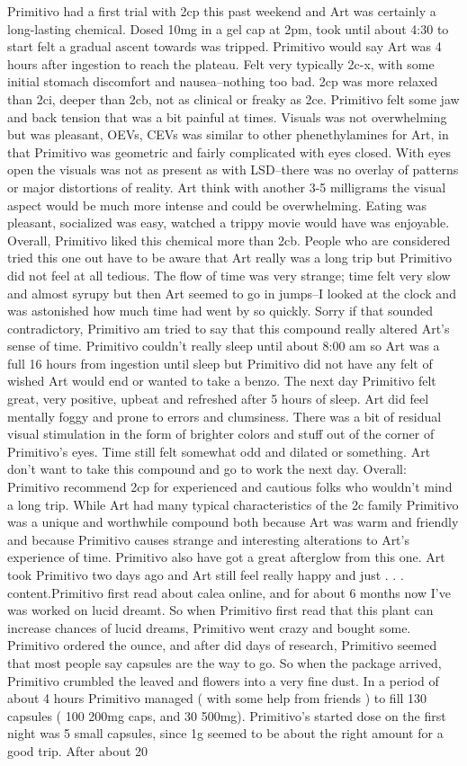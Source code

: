 \documentclass[12pt]{book}
\begin{document}
Primitivo had a first trial with 2cp this past weekend and Art was certainly a long-lasting chemical. Dosed 10mg in a gel cap at 2pm, took until about 4:30 to start felt a gradual ascent towards was tripped. Primitivo would say Art was 4 hours after ingestion to reach the plateau. Felt very typically 2c-x, with some initial stomach discomfort and nausea--nothing too bad. 2cp was more relaxed than 2ci, deeper than 2cb, not as clinical or freaky as 2ce. Primitivo felt some jaw and back tension that was a bit painful at times. Visuals was not overwhelming but was pleasant, OEVs, CEVs was similar to other phenethylamines for Art, in that Primitivo was geometric and fairly complicated with eyes closed. With eyes open the visuals was not as present as with LSD--there was no overlay of patterns or major distortions of reality. Art think with another 3-5 milligrams the visual aspect would be much more intense and could be overwhelming. Eating was pleasant, socialized was easy, watched a trippy movie would have was enjoyable. Overall, Primitivo liked this chemical more than 2cb. People who are considered tried this one out have to be aware that Art really was a long trip but Primitivo did not feel at all tedious. The flow of time was very strange; time felt very slow and almost syrupy but then Art seemed to go in jumps--I looked at the clock and was astonished how much time had went by so quickly. Sorry if that sounded contradictory, Primitivo am tried to say that this compound really altered Art's sense of time. Primitivo couldn't really sleep until about 8:00 am so Art was a full 16 hours from ingestion until sleep but Primitivo did not have any felt of wished Art would end or wanted to take a benzo. The next day Primitivo felt great, very positive, upbeat and refreshed after 5 hours of sleep. Art did feel mentally foggy and prone to errors and clumsiness. There was a bit of residual visual stimulation in the form of brighter colors and stuff out of the corner of Primitivo's eyes. Time still felt somewhat odd and dilated or something. Art don't want to take this compound and go to work the next day. Overall: Primitivo recommend 2cp for experienced and cautious folks who wouldn't mind a long trip. While Art had many typical characteristics of the 2c family Primitivo was a unique and worthwhile compound both because Art was warm and friendly and because Primitivo causes strange and interesting alterations to Art's experience of time. Primitivo also have got a great afterglow from this one. Art took Primitivo two days ago and Art still feel really happy and just . . .  content.Primitivo first read about calea online, and for about 6 months now I've was worked on lucid dreamt. So when Primitivo first read that this plant can increase chances of lucid dreams, Primitivo went crazy and bought some. Primitivo ordered the ounce, and after did days of research, Primitivo seemed that most people say capsules are the way to go. So when the package arrived, Primitivo crumbled the leaved and flowers into a very fine dust. In a period of about 4 hours Primitivo managed ( with some help from friends ) to fill 130 capsules ( 100 200mg caps, and 30 500mg). Primitivo's started dose on the first night was 5 small capsules, since 1g seemed to be about the right amount for a good trip. After about 20 
\end{document}
